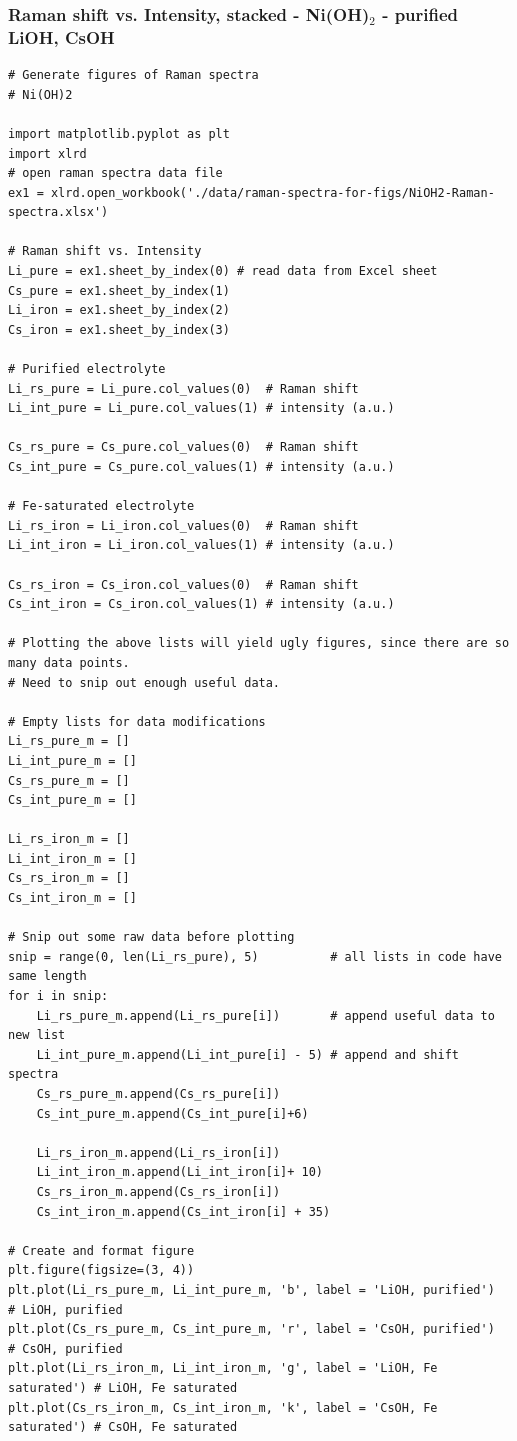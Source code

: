 \documentclass[journal=jpccck,manuscript=suppinfo,email=true]{achemso}
\begin{document}
\subsubsection{Raman shift vs. Intensity, stacked - Ni(OH)$_{\text{2}}$ - purified LiOH, CsOH}
\label{sec-6-3-3}
\begin{verbatim}
# Generate figures of Raman spectra
# Ni(OH)2

import matplotlib.pyplot as plt
import xlrd
# open raman spectra data file
ex1 = xlrd.open_workbook('./data/raman-spectra-for-figs/NiOH2-Raman-spectra.xlsx')

# Raman shift vs. Intensity
Li_pure = ex1.sheet_by_index(0) # read data from Excel sheet
Cs_pure = ex1.sheet_by_index(1)
Li_iron = ex1.sheet_by_index(2)
Cs_iron = ex1.sheet_by_index(3)

# Purified electrolyte
Li_rs_pure = Li_pure.col_values(0)  # Raman shift
Li_int_pure = Li_pure.col_values(1) # intensity (a.u.)

Cs_rs_pure = Cs_pure.col_values(0)  # Raman shift
Cs_int_pure = Cs_pure.col_values(1) # intensity (a.u.)

# Fe-saturated electrolyte
Li_rs_iron = Li_iron.col_values(0)  # Raman shift
Li_int_iron = Li_iron.col_values(1) # intensity (a.u.)

Cs_rs_iron = Cs_iron.col_values(0)  # Raman shift
Cs_int_iron = Cs_iron.col_values(1) # intensity (a.u.)

# Plotting the above lists will yield ugly figures, since there are so many data points.
# Need to snip out enough useful data.

# Empty lists for data modifications
Li_rs_pure_m = []
Li_int_pure_m = []
Cs_rs_pure_m = []
Cs_int_pure_m = []

Li_rs_iron_m = []
Li_int_iron_m = []
Cs_rs_iron_m = []
Cs_int_iron_m = []

# Snip out some raw data before plotting
snip = range(0, len(Li_rs_pure), 5)          # all lists in code have same length
for i in snip:
    Li_rs_pure_m.append(Li_rs_pure[i])       # append useful data to new list
    Li_int_pure_m.append(Li_int_pure[i] - 5) # append and shift spectra
    Cs_rs_pure_m.append(Cs_rs_pure[i])
    Cs_int_pure_m.append(Cs_int_pure[i]+6)

    Li_rs_iron_m.append(Li_rs_iron[i])
    Li_int_iron_m.append(Li_int_iron[i]+ 10)
    Cs_rs_iron_m.append(Cs_rs_iron[i])
    Cs_int_iron_m.append(Cs_int_iron[i] + 35)

# Create and format figure
plt.figure(figsize=(3, 4))
plt.plot(Li_rs_pure_m, Li_int_pure_m, 'b', label = 'LiOH, purified')     # LiOH, purified
plt.plot(Cs_rs_pure_m, Cs_int_pure_m, 'r', label = 'CsOH, purified')     # CsOH, purified
plt.plot(Li_rs_iron_m, Li_int_iron_m, 'g', label = 'LiOH, Fe saturated') # LiOH, Fe saturated
plt.plot(Cs_rs_iron_m, Cs_int_iron_m, 'k', label = 'CsOH, Fe saturated') # CsOH, Fe saturated


\end{verbatim}
\end{document}
